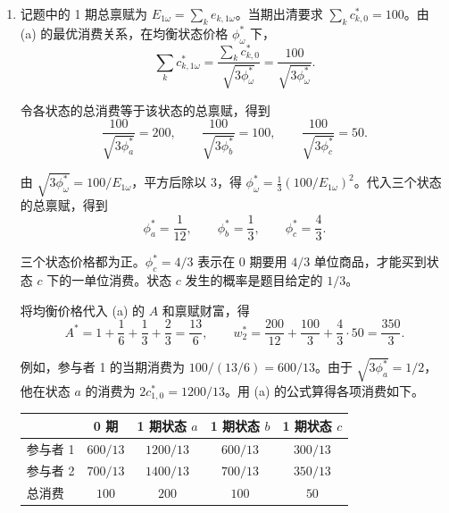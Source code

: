 \begin{solution}[blank-type=manual,blank-vsep=9\baselineskip]
\begin{enumerate}[label=(\alph*)]
    因此两人的最优消费为
    \[
       c_{k,0}^*=\frac{w_k}{A},\qquad
       c_{k,1\omega}^*=\frac{w_k}{A\sqrt{3\phi_\omega}},
       \quad k=1,2,\ \omega=a,b,c.
    \]

    这些消费均严格为正且满足预算，目标函数严格凹，所以这是一阶条件给出的唯一最优解。每份阿罗证券在对应状态支付一单位商品，因此参与者在状态 $\omega$ 的最优净买入量为 $\theta_{k,\omega}^*=c_{k,1\omega}^*-e_{k,1\omega}$\ifdefined\WJHandoutKnowledge（见正文[~节（禀赋财富与预算约束）]的净交易关系）\fi。参与者 1 在三个状态都没有未来禀赋，所需的未来消费都由证券买入取得。参与者 2 则分别从三个状态的最优消费中扣除禀赋 $200,100,50$，得到净买入量。

    \item 记题中的 1 期总禀赋为 $E_{1\omega}=\sum_k e_{k,1\omega}$。当期出清要求 $\sum_k c_{k,0}^*=100$。由 (a) 的最优消费关系，在均衡状态价格 $\phi_\omega^*$ 下，
    \[
        \sum_k c_{k,1\omega}^*
        =\frac{\sum_k c_{k,0}^*}{\sqrt{3\phi_\omega^*}}
        =\frac{100}{\sqrt{3\phi_\omega^*}}.
    \]

    令各状态的总消费等于该状态的总禀赋，得到
    \[
       \frac{100}{\sqrt{3\phi_a^*}}=200,\qquad
       \frac{100}{\sqrt{3\phi_b^*}}=100,\qquad
       \frac{100}{\sqrt{3\phi_c^*}}=50.
    \]

    由 $\sqrt{3\phi_\omega^*}=100/E_{1\omega}$，平方后除以 $3$，得 $\phi_\omega^*=\tfrac13(100/E_{1\omega})^2$。代入三个状态的总禀赋，得到
    \[
       \phi_a^*=\frac1{12},\qquad\phi_b^*=\frac13,\qquad\phi_c^*=\frac43.
    \]

    三个状态价格都为正。$\phi_c^*=4/3$ 表示在 0 期要用 $4/3$ 单位商品，才能买到状态 $c$ 下的一单位消费。状态 $c$ 发生的概率是题目给定的 $1/3$。

    将均衡价格代入 (a) 的 $A$ 和禀赋财富，得
    \[
       A^*=1+\frac16+\frac13+\frac23=\frac{13}{6},
       \qquad
       w_2^*=\frac{200}{12}+\frac{100}{3}+\frac43\cdot50=\frac{350}{3}.
    \]

    例如，参与者 1 的当期消费为 $100/(13/6)=600/13$。由于 $\sqrt{3\phi_a^*}=1/2$，他在状态 $a$ 的消费为 $2c_{1,0}^*=1200/13$。用 (a) 的公式算得各项消费如下。
    \begin{center}
    \begin{tabular}{lcccc}
      \toprule
      & 0 期 & 1 期状态 $a$ & 1 期状态 $b$ & 1 期状态 $c$ \\
      \midrule
      参与者 1 & $600/13$ & $1200/13$ & $600/13$ & $300/13$ \\
      参与者 2 & $700/13$ & $1400/13$ & $700/13$ & $350/13$ \\
      总消费 & $100$ & $200$ & $100$ & $50$ \\
      \bottomrule
    \end{tabular}
    \end{center}


\end{enumerate}
\end{solution}
